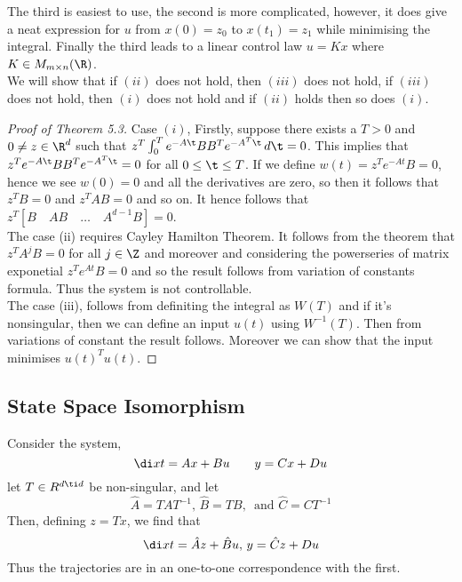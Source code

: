The third is easiest to use, the second is more complicated, however, it does give a neat expression for $u$ from $x(0) = z_0$ to $x(t_1) = z_1$ while minimising the integral. Finally the third leads to a linear control law $u = Kx$ where $K \in M_{m \times n}(\R)$.\\

\noindent
We will show that if $(ii)$ does not hold, then $(iii)$ does not hold, if $(iii)$ does not hold, then $(i)$ does not hold and if $(ii)$ holds then so does $(i)$.\\

\begin{proof}[Proof of Theorem 5.3]
  Case $(i)$, Firstly, suppose there exists a $T > 0$ and $0 \ne z \in \R^d$ such that $z^T\int_0^T e^{-A\t}BB^T e^{-A^T\t}\,d\t = 0$. This implies that $z^T e^{-A\t}BB^T e^{-A^T\t} = 0$ for all $0 \le \t \le T$. If we define $w(t) = z^T e^{-At}B = 0$, hence we see $w(0) = 0$ and all the derivatives are zero, so then it follows that $z^TB = 0$ and $z^TAB = 0$ and so on.
  It hence follows that $z^T [B \quad AB \quad \dots \quad A^{d-1}B] = 0$.\\

  \noindent
  The case (ii) requires Cayley Hamilton Theorem. It follows from the theorem that $z^T A^jB = 0$ for all $j \in \Z$ and moreover and considering the powerseries of matrix exponetial $z^Te^{At}B = 0$ and so the result follows from variation of constants formula. Thus the system is not controllable.\\

  \noindent
  The case (iii), follows from definiting the integral as $W(T)$ and if it's nonsingular, then we can define an input $u(t)$ using $W^{-1}(T)$. Then from variations of constant the result follows. Moreover we can show that the input minimises $u(t)^Tu(t)$.
\end{proof}

\subsection{State Space Isomorphism}
Consider the system,
$$ \di x t = Ax + Bu \qquad y = Cx + Du $$
let $T \in R^{d \ti d}$ be non-singular, and let
$$ \hat A = TAT^{-1},\, \hat B = TB,\, \text{ and } \hat C = CT^{-1} $$
Then, defining $z = Tx$, we find that
$$ \di x t = \hat Az + \hat Bu,\, y = \hat Cz + Du $$
Thus the trajectories are in an one-to-one correspondence with the first. \\

